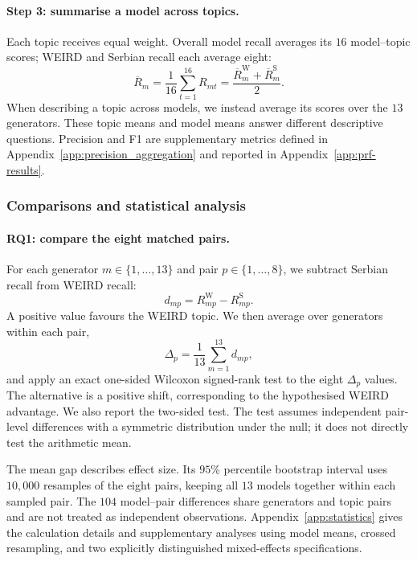 \documentclass[11pt,a4paper]{article}
\begin{document}
\paragraph{Step 3: summarise a model across topics.}
Each topic receives equal weight. Overall model recall averages its $16$ model--topic scores; WEIRD and Serbian recall each average eight:
\begin{equation}
\overline R_m=\frac{1}{16}\sum_{t=1}^{16}R_{mt}
=\frac{\overline R_m^{\mathrm W}+\overline R_m^{\mathrm S}}{2}.
\label{eq:model-recall}
\end{equation}
When describing a topic across models, we instead average its scores over the $13$ generators. These topic means and model means answer different descriptive questions. Precision and F1 are supplementary metrics defined in Appendix~\ref{app:precision_aggregation} and reported in Appendix~\ref{app:prf-results}.

\subsubsection{Comparisons and statistical analysis}
\label{sec:statistics}
\paragraph{RQ1: compare the eight matched pairs.}
For each generator $m\in\{1,\ldots,13\}$ and pair $p\in\{1,\ldots,8\}$, we subtract Serbian recall from WEIRD recall:
\begin{equation}
d_{mp}=R_{mp}^{\mathrm W}-R_{mp}^{\mathrm S}.
\label{eq:pair-gap}
\end{equation}
A positive value favours the WEIRD topic. We then average over generators within each pair,
\begin{equation}
\Delta_p=\frac{1}{13}\sum_{m=1}^{13}d_{mp},
\label{eq:pair-mean}
\end{equation}
and apply an exact one-sided Wilcoxon signed-rank test to the eight $\Delta_p$ values. The alternative is a positive shift, corresponding to the hypothesised WEIRD advantage. We also report the two-sided test. The test assumes independent pair-level differences with a symmetric distribution under the null; it does not directly test the arithmetic mean.

The mean gap describes effect size. Its $95$\% percentile bootstrap interval uses $10{,}000$ resamples of the eight pairs, keeping all $13$ models together within each sampled pair. The $104$ model--pair differences share generators and topic pairs and are not treated as independent observations. Appendix~\ref{app:statistics} gives the calculation details and supplementary analyses using model means, crossed resampling, and two explicitly distinguished mixed-effects specifications.
\end{document}
